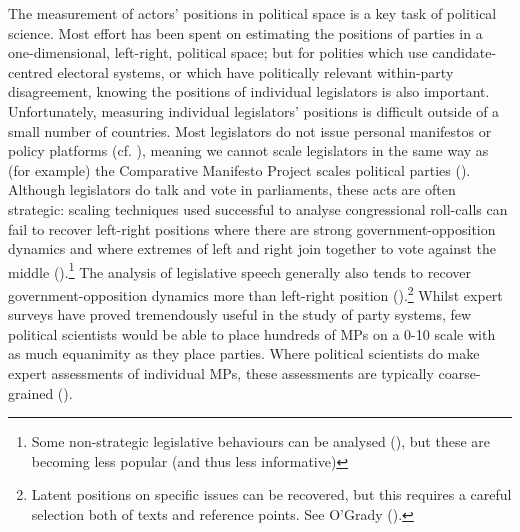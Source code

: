\documentclass[
]{article}
\begin{document}
The measurement of actors' positions in political space is a key task of
political science. Most effort has been spent on estimating the
positions of parties in a one-dimensional, left-right, political space;
but for polities which use candidate-centred electoral systems, or which
have politically relevant within-party disagreement, knowing the
positions of individual legislators is also important. Unfortunately,
measuring individual legislators' positions is difficult outside of a
small number of countries. Most legislators do not issue personal
manifestos or policy platforms (cf.
), meaning we
cannot scale legislators in the same way as (for example) the
Comparative Manifesto Project scales political parties
(). Although
legislators do talk and vote in parliaments, these acts are often
strategic: scaling techniques used successful to analyse congressional
roll-calls can fail to recover left-right positions where there are
strong government-opposition dynamics and where extremes of left and
right join together to vote against the middle
().\footnote{Some
  non-strategic legislative behaviours can be analysed
  (), but these
  are becoming less popular (and thus less informative)} The analysis of
legislative speech generally also tends to recover government-opposition
dynamics more than left-right position
().\footnote{Latent positions on specific issues can be recovered,
  but this requires a careful selection both of texts and reference
  points. See O'Grady ().}
Whilst expert surveys have proved tremendously useful in the study of
party systems, few political scientists would be able to place hundreds
of MPs on a 0-10 scale with as much equanimity as they place parties.
Where political scientists do make expert assessments of individual MPs,
these assessments are typically coarse-grained
().
\end{document}

